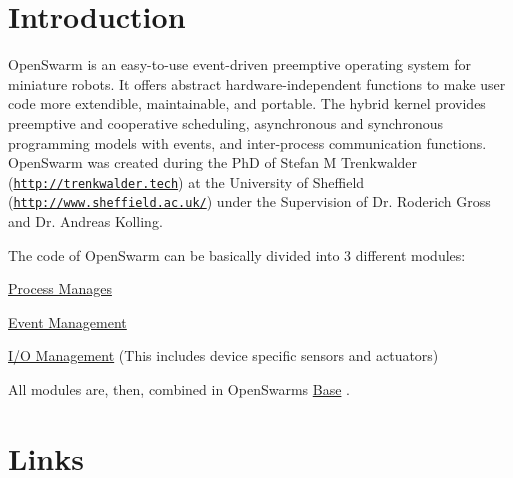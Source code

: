 \hypertarget{index_intro_sec}{}\section{Introduction}\label{index_intro_sec}
Open\+Swarm is an easy-\/to-\/use event-\/driven preemptive operating system for miniature robots. It offers abstract hardware-\/independent functions to make user code more extendible, maintainable, and portable. The hybrid kernel provides preemptive and cooperative scheduling, asynchronous and synchronous programming models with events, and inter-\/process communication functions. ~\newline
~\newline
 Open\+Swarm was created during the Ph\+D of Stefan M Trenkwalder (\href{http://trenkwalder.tech}{\tt http\+://trenkwalder.\+tech}) at the University of Sheffield (\href{http://www.sheffield.ac.uk/}{\tt http\+://www.\+sheffield.\+ac.\+uk/}) under the Supervision of Dr. Roderich Gross and Dr. Andreas Kolling.

The code of Open\+Swarm can be basically divided into 3 different modules\+:
\begin{DoxyItemize}
\item \hyperlink{group__process}{Process Manages}
\item \hyperlink{group__events}{Event Management}
\item \hyperlink{group__io}{I/\+O Management} (This includes device specific sensors and actuators)
\end{DoxyItemize}

All modules are, then, combined in Open\+Swarm\textquotesingle{}s \hyperlink{group__base}{Base} .

\hypertarget{index_link_sec}{}\section{Links}\label{index_link_sec}


